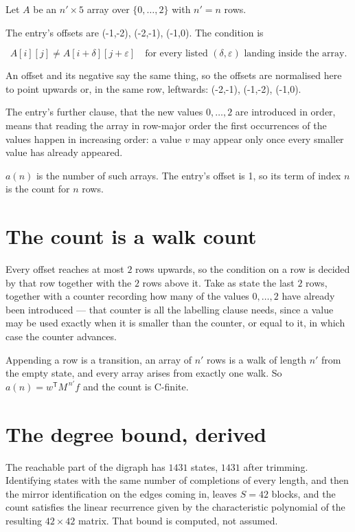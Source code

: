 \documentclass[11pt]{article}
\theoremstyle{definition}
\begin{document}
Let $A$ be an $n' \times 5$ array over $\{0,\dots,2\}$ with $n' = n$ rows.

The entry's offsets are (-1,-2), (-2,-1), (-1,0). The condition is

\[A[i][j] \ne A[i{+}\delta][j{+}\varepsilon]\quad\text{for every listed }(\delta,\varepsilon)\text{ landing inside the array.}\]

An offset and its negative say the same thing, so the offsets are normalised here to point upwards or, in the same row, leftwards: (-2,-1), (-1,-2), (-1,0).

The entry's further clause, that the new values $0,\dots,2$ are introduced in order, means that reading the array in row-major order the first occurrences of the values happen in increasing order: a value $v$ may appear only once every smaller value has already appeared.

$a(n)$ is the number of such arrays. The entry's offset is 1, so its term of index $n$ is the count for $n$ rows.

\section{The count is a walk count}

Every offset reaches at most $2$ rows upwards, so the condition on a row is decided by that row together with the $2$ rows above it. Take as state the last $2$ rows, together with a counter recording how many of the values $0,\dots,2$ have already been introduced --- that counter is all the labelling clause needs, since a value may be used exactly when it is smaller than the counter, or equal to it, in which case the counter advances.

Appending a row is a transition, an array of $n'$ rows is a walk of length $n'$ from the empty state, and every array arises from exactly one walk. So $a(n) = w^{\mathsf T}M^{\,n'}f$ and the count is C-finite.

\section{The degree bound, derived}

The reachable part of the digraph has $1431$ states, $1431$ after trimming. Identifying states with the same number of completions of every length, and then the mirror identification on the edges coming in, leaves $S = 42$ blocks, and the count satisfies the linear recurrence given by the characteristic polynomial of the resulting $42\times42$ matrix. That bound is computed, not assumed.
\end{document}
